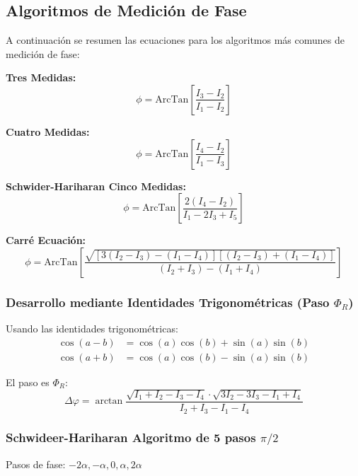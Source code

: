 \documentclass[12pt]{article}
\begin{document}
	\subsection{Algoritmos de Medición de Fase}
	A continuación se resumen las ecuaciones para los algoritmos más comunes de medición de fase:
	
	\textbf{Tres Medidas:}
	\begin{equation*}
		\phi = \text{ArcTan}\left[\frac{I_3 - I_2}{I_1 - I_2}\right]
	\end{equation*}
	
	\textbf{Cuatro Medidas:}
	\begin{equation*}
		\phi = \text{ArcTan}\left[\frac{I_4 - I_2}{I_1 - I_3}\right]
	\end{equation*}
	
	\textbf{Schwider-Hariharan Cinco Medidas:}
	\begin{equation*}
		\phi = \text{ArcTan}\left[\frac{2(I_4 - I_2)}{I_1 - 2I_3 + I_5}\right]
	\end{equation*}
	
	\textbf{Carré Ecuación:}
	\begin{equation*}
		\phi = \text{ArcTan}\left[\frac{\sqrt{[3(I_2 - I_3) - (I_1 - I_4)][(I_2 - I_3) + (I_1 - I_4)]}}{(I_2 + I_3) - (I_1 + I_4)}\right]
	\end{equation*}
	
	\subsubsection*{Desarrollo mediante Identidades Trigonométricas (Paso $\Phi_R$)}
	Usando las identidades trigonométricas:
	\begin{align*}
		\cos(a-b) &= \cos(a)\cos(b) + \sin(a)\sin(b) \\
		\cos(a+b) &= \cos(a)\cos(b) - \sin(a)\sin(b)
	\end{align*}
	
	El paso es $\Phi_R$:
	\begin{equation*}
		\Delta\varphi = \arctan \frac{\sqrt{I_1 + I_2 - I_3 - I_4} \cdot \sqrt{3I_2 - 3I_3 - I_1 + I_4}}{I_2 + I_3 - I_1 - I_4}
	\end{equation*}
	
	\subsubsection*{Schwideer-Hariharan Algoritmo de 5 pasos $\pi/2$}
	Pasos de fase: $-2\alpha, -\alpha, 0, \alpha, 2\alpha$
	
\end{document}
